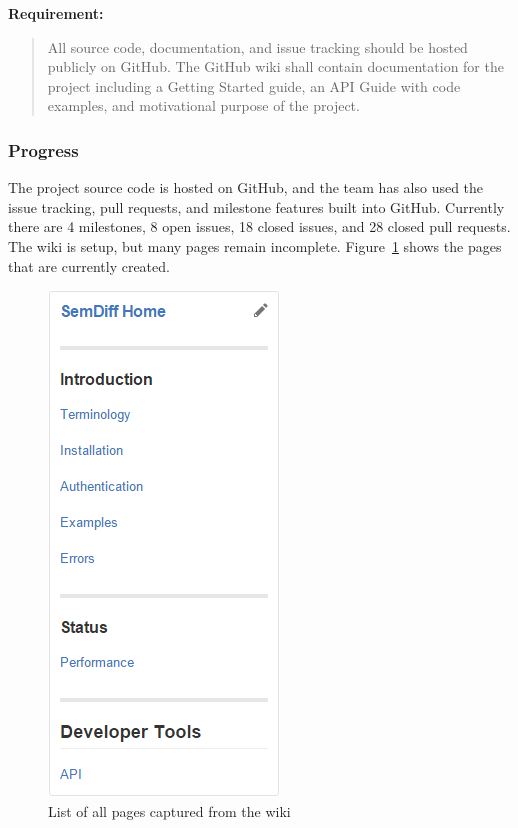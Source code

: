 \documentclass[draftclsnofoot,onecolumn]{IEEEtran}
\begin{document}
\textbf{Requirement:}

\begin{quote}

All source code, documentation, and issue tracking should be hosted publicly 
on GitHub. The GitHub wiki shall contain documentation for the project 
including a Getting Started guide, an API Guide with code examples, and 
motivational purpose of the project.

\end{quote}

\subsubsection{Progress}
The project source code is hosted on GitHub, and the team has also used the 
issue tracking, pull requests, and milestone features built into GitHub. 
Currently there are 4 milestones, 8 open issues, 18 closed issues, and 28 
closed pull requests. The wiki is setup, but many pages remain incomplete. 
Figure~\ref{wikilist} shows the pages that are currently created.

\begin{figure}[!htb]
\centering
\includegraphics[scale=1]{WikiList}
\caption{List of all pages captured from the wiki}
\label{wikilist}
\end{figure}
\end{document}
